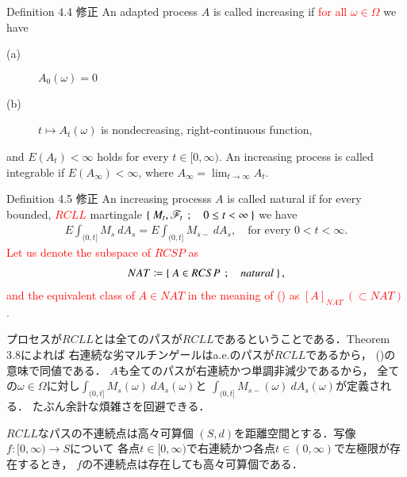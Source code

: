 	\begin{itembox}[l]{Definition 4.4 修正}
		An adapted process $A$ is called increasing if \textcolor{red}{for all $\omega \in \Omega$} we have
		\begin{description}
			\item[(a)] $A_0(\omega) = 0$
			\item[(b)] $t \longmapsto A_t(\omega)$ is nondecreasing, right-continuous function,
		\end{description}
		and $E(A_t) < \infty$ holds for every $t \in [0,\infty)$.
		An increasing process is called integrable if $E(A_\infty) < \infty$,
		where $A_\infty = \lim_{t \to \infty} A_t$.
	\end{itembox}
	
	\begin{itembox}[l]{Definition 4.5 修正}
		An increasing processs $A$ is called natural if for every bounded, 
		\textcolor{red}{$RCLL$} martingale $\left\{\ M_t,\mathscr{F}_t\ \, ; \quad 0 \leq t < \infty\ \right\}$ we have
		\begin{align}
			E \int_{(0,t]} M_s\ dA_s = E \int_{(0,t]} M_{s-}\ dA_s,
			\quad \mbox{for every $0 < t < \infty$}.
		\end{align}
		\textcolor{red}{Let us denote the subspace of $RCSP$ as
		\begin{align}
			NAT \coloneqq
			\left\{\ A \in RCSP\ \, ; \quad natural\ \right\},
		\end{align}
		and the equivalent class of $A \in NAT$
		in the meaning of () as $[A]_{NAT}\ ( \subset NAT)$.}
	\end{itembox}
	
	プロセスが$RCLL$とは全てのパスが$RCLL$であるということである．Theorem 3.8によれば
	右連続な劣マルチンゲールはa.e.のパスが$RCLL$であるから，
	()の意味で同値である．
	$A$も全てのパスが右連続かつ単調非減少であるから，
	全ての$\omega \in \Omega$に対し$\int_{(0,t]} M_s(\omega)\ dA_s(\omega)$と
	$\int_{(0,t]} M_{s-}(\omega)\ dA_s(\omega)$が定義される．
	たぶん余計な煩雑さを回避できる．
		
	\begin{itembox}[l]{$RCLL$なパスの不連続点は高々可算個}
		$(S,d)$を距離空間とする．写像$f:[0,\infty) \longrightarrow S$について
		各点$t \in [0,\infty)$で右連続かつ各点$t \in (0,\infty)$で左極限が存在するとき，
		$f$の不連続点は存在しても高々可算個である．
	\end{itembox}
	
